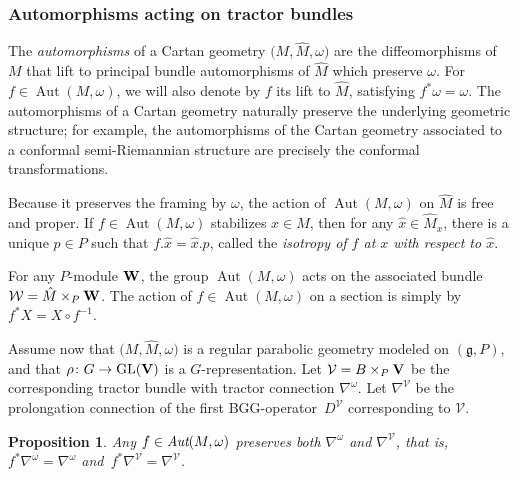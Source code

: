 \documentclass[pdftex]{sigma}
\numberwithin{equation}{section}
\newtheorem{prop}[thm]{Proposition}
\theoremstyle{definition}
\def\V{{\bf V}}
\newcommand{\cV}{{\mathcal V}}
\newcommand{\cS}{{\mathcal S}}
\def\g{{\mathfrak g}}
\newcommand{\Aut}{\operatorname{Aut}}
\begin{document}
\subsubsection{Automorphisms acting on tractor bundles}
\label{sec.aut.tractor}

The \emph{automorphisms} of a Cartan geometry $\bigl(M,\hat{M},\omega\bigr)$ are the diffeomorphisms of $M$ that lift to principal bundle automorphisms of $\hat{M}$ which preserve $\omega$. For $f \in \operatorname{Aut}(M,\omega)$, we will also denote by $f$ its lift to $\hat{M}$, satisfying $f^* \omega = \omega$.
The automorphisms of a Cartan geometry naturally preserve the underlying geometric structure; for example, the automorphisms of the Cartan geometry associated to a conformal semi-Riemannian structure are precisely the conformal transformations.

Because it preserves the framing by $\omega$, the action of $\Aut(M,\omega)$ on $\hat{M}$ is free and proper. If $f \in \Aut(M,\omega)$ stabilizes $x \in M$, then for any $\hat{x} \in \hat{M}_x$, there is a unique $p \in P$ such that {$f.\hat{x} = \hat{x}.p$}, called the \emph{isotropy of $f$ at $x$ with respect to $\hat{x}$}.

For any $P$-module ${\bf W}$, the group $\Aut(M,\omega)$ acts on the associated bundle $\mathcal{W} = \hat{M} \times_P {\bf W}$.
The action of $f \in \Aut(M,\omega)$ on a section \smash{$X \in \Gamma(\cS)\cong C^{\infty}\bigl(\hat{M}, {\bf W}\bigr)^P$} is simply by
$f^*X = X \circ f^{-1}$.

Assume now that $\bigl(M,\hat{M},\omega\bigr)$ is a regular parabolic geometry modeled on $(\g, P)$, and that $\rho\colon G\rightarrow \textrm{GL}(\V)$ is a $G$-representation.
Let $\cV=B\times_P\V$ be the corresponding tractor bundle with tractor connection $\nabla^{\omega}$. Let $\nabla^{\cV}$ be the prolongation connection of the
first BGG-operator~$D^{\cV}$ corresponding to $\cV$.
\begin{prop} Any $f \in\emph{Aut}(M, \omega)$ preserves both $\nabla^\omega$ and $\nabla^{\cV}$, that is, $f^* \nabla^\omega = \nabla^\omega$ and~${f^*\nabla^{\cV}=\nabla^{\cV}}$.
\end{prop}
\end{document}
